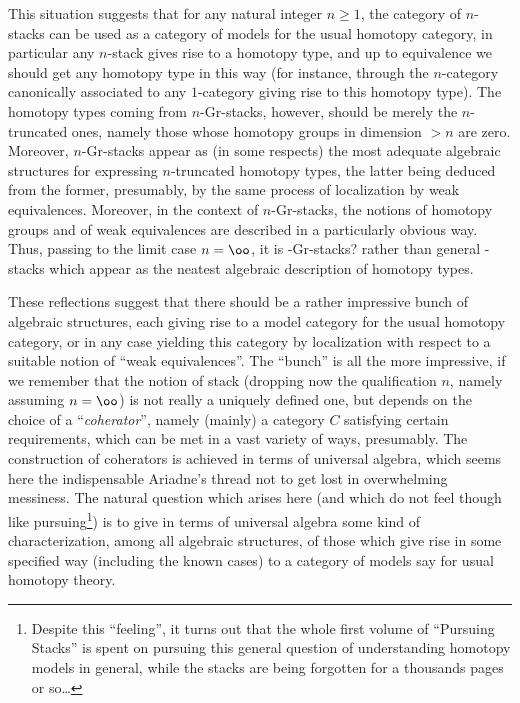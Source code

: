 This situation suggests that for any natural integer $n\ge1$, the
category of $n$-stacks can be used as a category of models for the
usual homotopy category, in particular any $n$-stack gives rise to a
homotopy type, and up to equivalence we should get any homotopy type
in this way (for instance, through the $n$-category canonically
associated to any $1$-category giving rise to this homotopy type). The
homotopy types coming from $n$-Gr-stacks, however, should be merely
the $n$-truncated ones, namely those whose homotopy groups in
dimension $>n$ are zero. Moreover, $n$-Gr-stacks appear as (in some respects) the most
adequate algebraic structures for expressing $n$-truncated homotopy
types, the latter being deduced from the former, presumably, by the
same process of localization by weak equivalences. Moreover, in the
context of $n$-Gr-stacks, the notions of homotopy groups and of weak
equivalences are described in a particularly obvious way. Thus,
passing to the limit case $n=\oo$, it is \oo-Gr-stacks? rather than general \oo-stacks which
appear as the neatest algebraic description of homotopy types.

These reflections suggest that there should be a rather
impressive bunch of algebraic structures, each giving rise to a model
category for the usual homotopy category, or in any case yielding this
category by localization with respect to a suitable notion of ``weak
equivalences''. The ``bunch'' is all the more impressive, if we
remember that the notion of stack (dropping now the qualification $n$,
namely assuming $n=\oo$) is not really a uniquely defined one, but
depends on the choice of a ``\emph{coherator}'', namely (mainly) a category
$C$ satisfying certain requirements, which can be met in a vast
variety of ways, presumably. The construction of coherators is
achieved in terms of universal algebra, which seems here the
indispensable Ariadne's thread not to get lost in overwhelming
messiness. The natural question which arises here (and which do not
feel though like pursuing\footnote{Despite this ``feeling'', it turns out that the whole first volume of ``Pursuing Stacks'' is spent on pursuing this general question of understanding homotopy models in general, while the stacks are being forgotten for a thousands pages or so\dots}) is to give in terms of universal algebra
some kind of characterization, among all algebraic structures, of
those which give rise in some specified way (including the known
cases) to a category of models say for usual homotopy theory.

